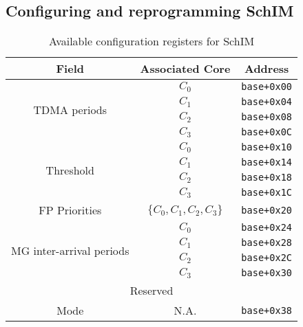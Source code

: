 \subsection{Configuring and reprogramming SchIM}
\begin{table}[!ht]
  \centering
  \caption{Available configuration registers for SchIM}
  \label{tab:configuration_port_structure}
  \begin{tabular}{|c||c|c|}
    \hline
    \multicolumn{1}{|c||}{Field}               & \multicolumn{1}{c|}{Associated Core}      & \multicolumn{1}{c|}{Address}        \\ \hline\hline
    \multirow{4}{*}{TDMA periods}             & $C_{0}$                                   & \verb|base+0x00|                    \\ \cline{2-3} 
    & $C_{1}$                                   & \verb|base+0x04|                    \\ \cline{2-3} 
    & $C_{2}$                                   & \verb|base+0x08|                    \\ \cline{2-3} 
    & $C_{3}$                                   & \verb|base+0x0C|                    \\ \hline
    \multirow{4}{*}{Threshold}                & $C_{0}$                                   & \verb|base+0x10|                    \\ \cline{2-3} 
    & $C_{1}$                                   & \verb|base+0x14|                    \\ \cline{2-3} 
    & $C_{2}$                                   & \verb|base+0x18|                    \\ \cline{2-3} 
    & $C_{3}$                                   & \verb|base+0x1C|                    \\ \hline
    FP Priorities                                & $\{C_{0}, C_{1}, C_{2}, C_{3}\}$          & \verb|base+0x20|                    \\ \hline
    \multirow{4}{*}{MG inter-arrival periods} & $C_{0}$                                   & \verb|base+0x24|                    \\ \cline{2-3} 
    & $C_{1}$                                   & \verb|base+0x28|                    \\ \cline{2-3} 
    & $C_{2}$                                   & \verb|base+0x2C|                    \\ \cline{2-3} 
    & $C_{3}$                                   & \verb|base+0x30|                    \\ \hline
    \multicolumn{3}{|c|}{Reserved}                                                                                              \\ \hline
    Mode                                      & N.A.                                      & \verb|base+0x38|                    \\ \hline
  \end{tabular}
\end{table}


